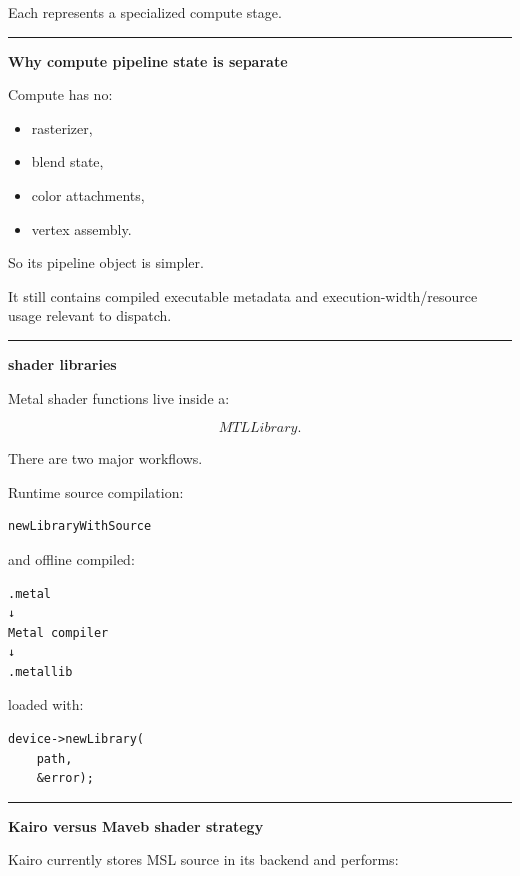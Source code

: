 Each represents a specialized compute stage.

\begin{center}\rule{0.5\linewidth}{0.5pt}\end{center}

\textbf{Why compute pipeline state is separate}

Compute has no:

\begin{itemize}
\tightlist
\item
  rasterizer,
\item
  blend state,
\item
  color attachments,
\item
  vertex assembly.
\end{itemize}

So its pipeline object is simpler.

It still contains compiled executable metadata and execution-width/resource usage relevant to dispatch.

\begin{center}\rule{0.5\linewidth}{0.5pt}\end{center}

\textbf{shader libraries}

Metal shader functions live inside a:

\[
MTLLibrary.
\]

There are two major workflows.

Runtime source compilation:

\begin{verbatim}
newLibraryWithSource
\end{verbatim}

and offline compiled:

\begin{verbatim}
.metal
↓
Metal compiler
↓
.metallib
\end{verbatim}

loaded with:

\begin{verbatim}
device->newLibrary(
    path,
    &error);
\end{verbatim}

\begin{center}\rule{0.5\linewidth}{0.5pt}\end{center}

\textbf{Kairo versus Maveb shader strategy}

Kairo currently stores MSL source in its backend and performs:

